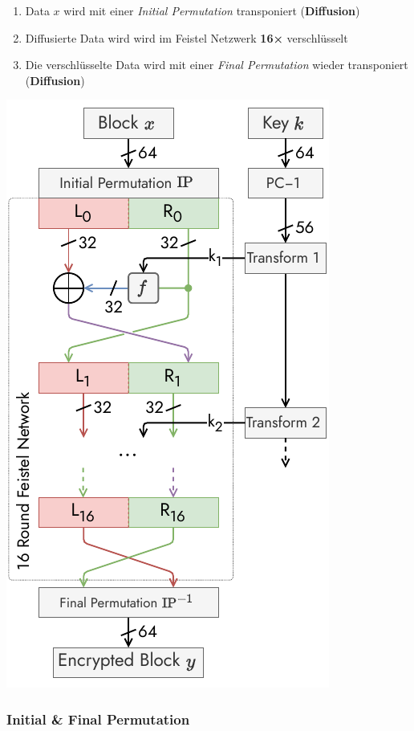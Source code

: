 \documentclass[
  10pt,
  a4paper,
]{article}
\providecommand{\tightlist}{%
  \setlength{\itemsep}{0pt}\setlength{\parskip}{0pt}}\usepackage{longtable,booktabs,array}
\begin{document}
\begin{multicols*}{2}
\begin{enumerate}
\def\labelenumi{\arabic{enumi}.}
\tightlist
\item
  Data \(x\) wird mit einer \emph{Initial Permutation} transponiert
  (\textbf{Diffusion})
\item
  Diffusierte Data wird wird im Feistel Netzwerk \textbf{16×}
  verschlüsselt
\item
  Die verschlüsselte Data wird mit einer \emph{Final Permutation} wieder
  transponiert (\textbf{Diffusion})
\end{enumerate}

\begin{center}
\includegraphics{images/crypto/des_detailed.pdf}
\end{center}

\subsubsection{Initial \& Final
Permutation}\label{initial-final-permutation}


\end{multicols*}
\end{document}
